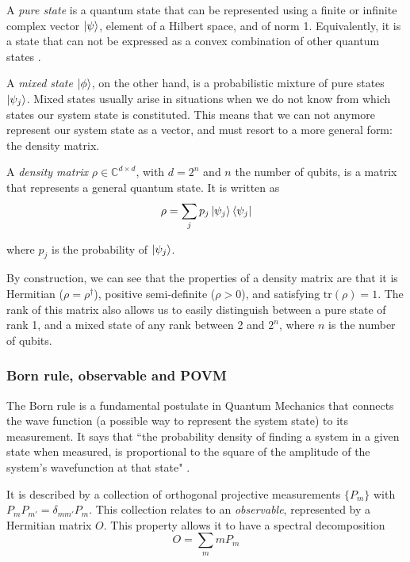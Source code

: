 \documentclass[12pt]{memoir}
\newcommand{\tr}{\text{tr}}
\begin{document}
A \textit{pure state} is a quantum state that can be represented using a finite or infinite complex vector $\ket \psi$, element of a Hilbert space, and of norm 1. Equivalently, it is a state that can not be expressed as a convex combination of other quantum states \cite{wiki:density-matrix}.\medbreak


A \textit{mixed state} $\ket \phi$, on the other hand, is a probabilistic mixture of pure states $\ket {\psi_j}$. Mixed states usually arise in situations when we do not know from which states our system state is constituted. This means that we can not anymore represent our system state as a vector, and must resort to a more general form: the density matrix.\medbreak


A \textit{density matrix} $\rho \in \mathbb{C}^{d \times d}$, with $d = 2^n$ and $n$ the number of qubits, is a matrix that represents a general quantum state. It is written as
\begin{equation}
    \rho = \sum_{j} p_j \ket{\psi_j} \bra{\psi_j}
\end{equation}

where $p_j$ is the probability of $\ket{\psi_j}$.\medbreak


By construction, we can see that the properties of a density matrix are that it is Hermitian ($\rho = \rho^{\dagger}$), positive semi-definite ($\rho > 0$), and satisfying $\tr(\rho) = 1$. The rank of this matrix also allows us to easily distinguish between a pure state of rank 1, and a mixed state of any rank between 2 and $2^n$, where $n$ is the number of qubits.


\subsubsection*{Born rule, observable and POVM}


The Born rule is a fundamental postulate in Quantum Mechanics that connects the wave function (a possible way to represent the system state) to its measurement. It says that ``the probability density of finding a system in a given state when measured, is proportional to the square of the amplitude of the system's wavefunction at that state" \cite{wiki:born-rule}.\medbreak

It is described by a collection of orthogonal projective measurements $\{P_m\}$ with $P_mP_{m'}=\delta_{mm'}P_m$. This collection relates to an \textit{observable}, represented by a Hermitian matrix $O$. This property allows it to have a spectral decomposition
\begin{equation}
    O = \sum_m m P_m
\end{equation}
\end{document}
